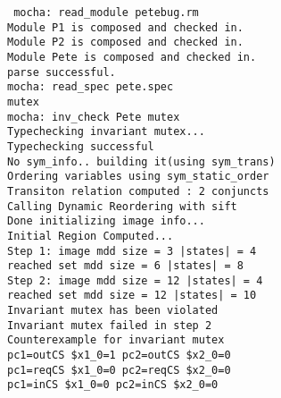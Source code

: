 \mypar
{\tt
mocha: read\_module petebug.rm \\
Module P1 is composed and checked in. \\
Module P2 is composed and checked in. \\
Module Pete is composed and checked in. \\
parse successful. \\
mocha: read\_spec pete.spec \\
mutex \\
mocha: inv\_check Pete mutex \\
Typechecking invariant mutex... \\
Typechecking successful \\
No sym\_info.. building it(using sym\_trans) \\
Ordering variables using sym\_static\_order \\
Transiton relation computed : 2 conjuncts \\
Calling Dynamic Reordering with sift \\
Done initializing image info... \\
Initial Region Computed... \\
Step 1: image mdd size =          3	 |states| =        4	\\
reached set mdd size =          6	 |states| =        8  \\
Step 2: image mdd size =         12	 |states| =        4  \\
reached set mdd size =         12	 |states| =       10 \\
Invariant mutex has been violated \\
Invariant mutex failed in step 2  \\
Counterexample for invariant mutex \\
pc1=outCS \$x1\_0=1 pc2=outCS \$x2\_0=0 \\
pc1=reqCS \$x1\_0=0 pc2=reqCS \$x2\_0=0 \\
pc1=inCS \$x1\_0=0 pc2=inCS \$x2\_0=0  \\
}

